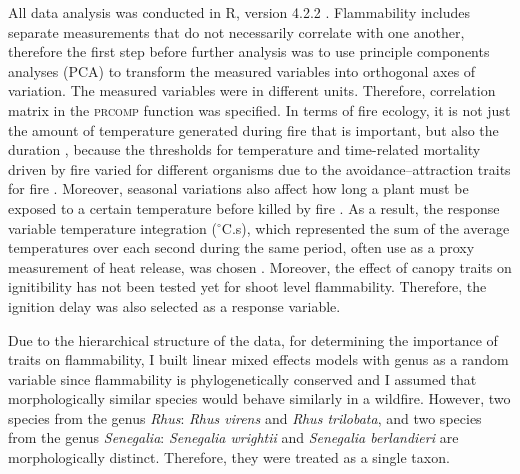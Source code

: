\documentclass[12pt]{report}
\newcommand{\pkg}[1]{\textsc{#1}}
\begin{document}
All data analysis was conducted in R, version 4.2.2 \citep{R}. 
Flammability includes separate measurements that do not necessarily correlate with one another, therefore the first step before further analysis was to use principle components analyses (PCA) to transform the measured variables into orthogonal axes of variation. The measured variables were in different units. Therefore, correlation matrix in the \pkg{prcomp} function was specified. In terms of fire ecology, it is not just the amount of temperature generated during fire that is important, but also the duration \citep{mcgranahan2020inconvenient}, because the thresholds for temperature and time-related mortality driven by fire varied for different organisms \citep{nelson1952observations,vines1968heat, bond1983dead, hengst1994bark,pinard1997fire,lawes2011bark, pingree2019myth} due to the avoidance–attraction traits for fire \citep{schwilk2001flammability, archibald2019unified}. Moreover, seasonal variations also affect how long a plant must be exposed to a certain temperature before killed by fire \citep{wright1970method}. As a result, the response variable temperature integration ($^{\circ}$C.s), which represented the sum of the average temperatures over each second during the same period, often use as a proxy measurement of heat release, was chosen \citep{gao2018grass, mcgranahan2020inconvenient}. Moreover, the effect of canopy traits on ignitibility has not been tested yet for shoot level flammability. Therefore, the ignition delay was also selected as a response variable.

Due to the hierarchical structure of the data, for determining the importance of traits on flammability, I built linear mixed effects models with genus as a random variable since flammability is phylogenetically conserved \citep{cui2020shoot} and I assumed that morphologically similar species would behave similarly in a wildfire. However, two species from the genus \emph{Rhus}: \emph{Rhus virens} and \emph{Rhus trilobata}, and two species from the genus \emph{Senegalia}: \emph{Senegalia wrightii} and \emph{Senegalia berlandieri} are morphologically distinct. Therefore, they were treated as a single taxon. 



\end{document}
